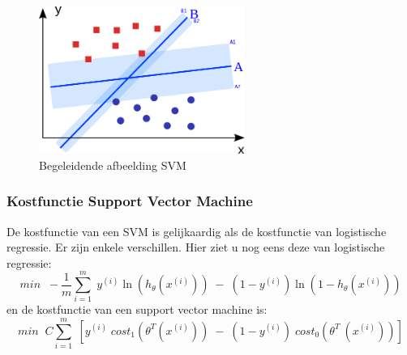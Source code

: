 \begin{figure}[]
	\centering
	\includegraphics[width=0.6\textwidth]{img/svmkopie}
	\caption{Begeleidende afbeelding SVM \autocite{svmGraph}}
	\label{fig:svm}
\end{figure}

\subsubsection{Kostfunctie Support Vector Machine}

De kostfunctie van een SVM is gelijkaardig als de kostfunctie van logistische regressie. Er zijn enkele verschillen. Hier ziet u nog eens deze van logistische regressie: 
$$ 
min \;\; -\frac{1}{m}\sum_{i=1}^{m} \;  y^{(i)}\ln(h_{\theta}(x^{(i)})) \;- \;(1-y^{(i)}) \ln(1-h_{\theta}(x^{(i)}))  
$$
en de kostfunctie van een support vector machine is: 
$$ 
min \;\; C\sum_{i=1}^{m} \; \left[ y^{(i)}\;cost_{1}(\theta^{T}(x^{(i)})) \;- \;(1-y^{(i)})\;cost_{0}(\theta^{T}\:(x^{(i)})) \right] 
$$

